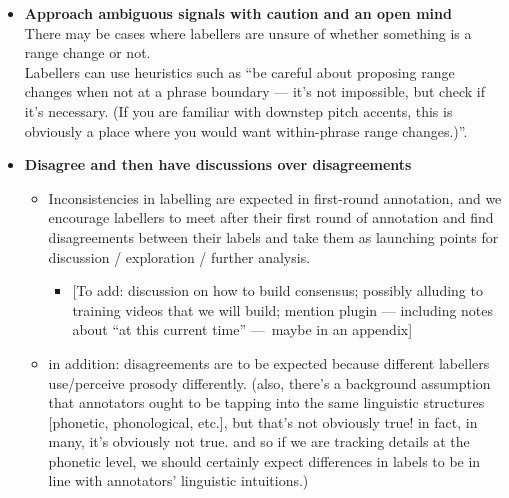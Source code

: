 \documentclass[11pt, twoside]{memoir}
\begin{document}
\begin{itemize}
\begin{itemize}
    \begin{itemize}
    \tightlist
    \item
      \textbf{Approach ambiguous signals with caution and an open
      mind}\\
      There may be cases where labellers are unsure of whether something
      is a range change or not.\\
      Labellers can use heuristics such as ``be careful about proposing
      range changes when not at a phrase boundary --- it's not
      impossible, but check if it's necessary. (If you are familiar with
      downstep pitch accents, this is obviously a place where you would
      want within-phrase range changes.)''.\\
    \item
      \textbf{Disagree and then have discussions over disagreements}

      \begin{itemize}
      \tightlist
      \item
        Inconsistencies in labelling are expected in first-round
        annotation, and we encourage labellers to meet after their first
        round of annotation and find disagreements between their labels
        and take them as launching points for discussion / exploration /
        further analysis.

        \begin{itemize}
        \tightlist
        \item
          {[}To add: discussion on how to build consensus; possibly
          alluding to training videos that we will build; mention plugin
          --- including notes about ``at this current time'' ---~maybe
          in an appendix{]}\\
        \end{itemize}
      \item
        in addition: disagreements are to be expected because different
        labellers use/perceive prosody differently. (also, there's a
        background assumption that annotators ought to be tapping into
        the same linguistic structures {[}phonetic, phonological,
        etc.{]}, but that's not obviously true! in fact, in many, it's
        obviously not true. and so if we are tracking details at the
        phonetic level, we should certainly expect differences in labels
        to be in line with annotators' linguistic intuitions.)


\end{itemize}
\end{itemize}
\end{itemize}
\end{itemize}
\end{document}
